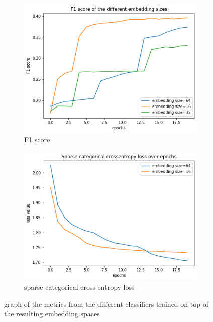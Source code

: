 \begin{figure}[t]
\centering
\begin{subfigure}{.5\linewidth}
  \centering
  \includegraphics[width=.9\linewidth]{study-doc/experiment_embedding_size/assets/classifier_f1.png}
  \caption{F1 score}
  \label{fig:embedding-size-classifier-f1}
\end{subfigure}%
\begin{subfigure}{.5\linewidth}
  \centering
  \includegraphics[width=.9\linewidth]{study-doc/experiment_embedding_size/assets/classifier_loss.png}
  \caption{sparse categorical cross-entropy loss}
  \label{fig:embedding-size-classifier-loss}
\end{subfigure}
\caption{graph of the metrics from the different classifiers trained on top of the resulting embedding spaces}
\label{fig:embedding-size-experiment-classifier-metrics}
\end{figure}
